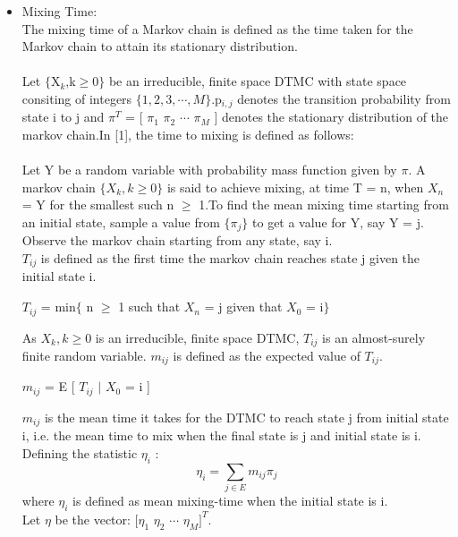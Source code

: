 \documentclass[12pt]{article}
\begin{document}
\begin{itemize}
\item Mixing Time: \\
The mixing time of a Markov chain is defined as the time taken for the Markov chain to attain its stationary distribution.
\\\\Let $\lbrace$X$_{k}$,k$\geq$0$\rbrace$ be an irreducible, finite space DTMC with state space consiting of integers $\lbrace 1,2,3,\cdots,M\rbrace$.p$_{i,j}$ denotes the transition probability from state i to j and $\pi^{T}$ = [ $\pi_{1}$ $\pi_{2}$ $\cdots$ $\pi_{M}$ ] denotes the stationary distribution of the markov chain.In [1], the time to mixing is defined as follows:
\\\\Let Y be a random variable with probability mass function given by $\pi$. A  markov chain $\lbrace X_{k},k\geq0 \rbrace$ is said to achieve mixing, at time T = n, when $X_{n}$ = Y for the smallest such n $\geq$ 1.To find the mean mixing time starting from an initial state, sample a value from $\lbrace\pi_{j}\rbrace$ to get a value for Y, say Y = j. Observe the markov chain starting from any state, say i.\\ $T_{ij}$ is defined as the first time the markov chain reaches state j given the initial state i.  
\begin{center}
$T_{ij}$ = min$\lbrace$ n $\geq$ 1 such that $X_{n}$ = j given that $X_{0}$ = i$\rbrace$  
\end{center}
As  ${X_{k}, k\geq0}$  is an irreducible, finite space DTMC, $T_{ij}$ is an almost-surely finite random variable. $m_{ij}$ is defined as the expected value of $T_{ij}$.
\begin{center}
$m_{ij}$ = E [  $T_{ij}$ $|$ $X_{0}$ = i ]\\
\end{center}
$m_{ij}$ is the mean time it takes for the DTMC to reach state j from initial state i, i.e. the mean time to mix when the final state is j and initial state is i. Defining the statistic $\eta_{i}$ :
\begin{equation}
\eta_{i} = \sum_{j\in\textit{E}} m_{ij}\pi_{j}
\end{equation}
where $\eta_{i}$ is defined as mean mixing-time when the initial state is i. \\
Let \textbf{$\eta$} be the vector: $[$$\eta_{1}$ $\eta_{2}$ $\cdots$ $\eta_{M}$$]^{T}$.\\

\end{itemize}
\end{document}
